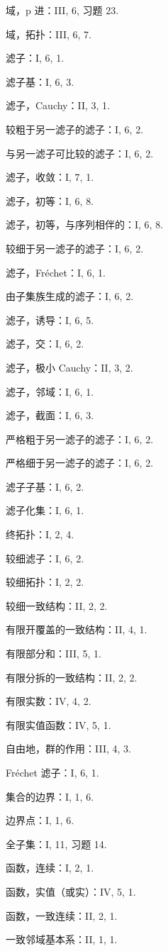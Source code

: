 域，p 进：III, 6, 习题 23.

域，拓扑：III, 6, 7.

滤子：I, 6, 1.

滤子基：I, 6, 3.

滤子，Cauchy：II, 3, 1.

较粗于另一滤子的滤子：I, 6, 2.

与另一滤子可比较的滤子：I, 6, 2.

滤子，收敛：I, 7, 1.

滤子，初等：I, 6, 8.

滤子，初等，与序列相伴的：I, 6, 8.

较细于另一滤子的滤子：I, 6, 2.

滤子，Fréchet：I, 6, 1.

由子集族生成的滤子：I, 6, 2.

滤子，诱导：I, 6, 5.

滤子，交：I, 6, 2.

滤子，极小 Cauchy：II, 3, 2.

滤子，邻域：I, 6, 1.

滤子，截面：I, 6, 3.

严格粗于另一滤子的滤子：I, 6, 2.

严格细于另一滤子的滤子：I, 6, 2.

滤子子基：I, 6, 2.

滤子化集：I, 6, 1.

终拓扑：I, 2, 4.

较细滤子：I, 6, 2.

较细拓扑：I, 2, 2.

较细一致结构：II, 2, 2.

有限开覆盖的一致结构：II, 4, 1.

有限部分和：III, 5, 1.

有限分拆的一致结构：II, 2, 2.

有限实数：IV, 4, 2.

有限实值函数：IV, 5, 1.

自由地，群的作用：III, 4, 3.

Fréchet 滤子：I, 6, 1.

集合的边界：I, 1, 6.

边界点：I, 1, 6.

全子集：I, 11, 习题 14.

函数，连续：I, 2, 1.

函数，实值（或实）：IV, 5, 1.

函数，一致连续：II, 2, 1.

一致邻域基本系：II, 1, 1.


